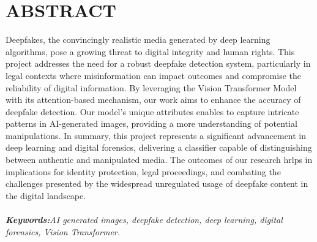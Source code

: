 


\section*{ABSTRACT}
\justify

Deepfakes, the convincingly realistic  media generated by deep learning algorithms, pose a growing threat to digital integrity and human rights. This project addresses the need for a robust deepfake detection system, particularly in legal contexts where misinformation can impact outcomes and compromise the reliability of digital information. By leveraging the Vision Transformer Model with its attention-based mechanism, our work aims to enhance the accuracy of deepfake detection. Our model's unique attributes enables to capture intricate patterns in AI-generated images, providing a more understanding of potential manipulations. In summary, this project represents a significant advancement in deep learning and digital forensics, delivering a classifier capable of distinguishing between authentic and manipulated media. The outcomes of our research hrlps in implications for identity protection, legal proceedings, and combating the challenges presented by the widespread unregulated usage of deepfake content in the digital landscape.\\
\\
\textit{\textbf{Keywords:}AI generated images, deepfake detection, deep learning, digital forensics, Vision Transformer.}


